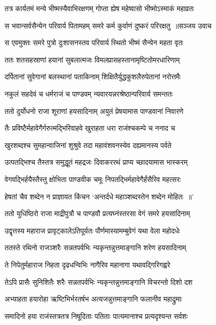 \twolineshloka
{तत्र कार्यतमं मन्ये भीष्मस्यैवाभिरक्षणम्}
{गोप्ता ह्येष महेष्वासो भीष्मोऽस्माकं महाव्रतः}


\threelineshloka
{स भवान्सर्वसैन्येन परिवार्य पितामहम्}
{समरे कर्म कुर्वाणं दुष्करं परिरक्षतु ॥सञ्जय उवाच}
{}


\twolineshloka
{स एवमुक्तः समरे पुत्रो दुःशासनस्तव}
{परिवार्य स्थितो भीष्मं सैन्येन महता वृतः}


\twolineshloka
{ततः शतसहस्राणां हयानां सुबलात्मजः}
{विमलप्रासहस्तानामृष्टितोमरधारिणाम्}


\twolineshloka
{दर्पितानां सुवेगानां बलस्थानां पताकिनाम्}
{शिक्षितैर्युद्धकुशलैरुपेतानां नरोत्तमैः}


\twolineshloka
{नकुलं सहदेवं च धर्मराजं च पाण्डवम्}
{न्यवारयन्नरश्रेष्ठान्परिवार्य समन्ततः}


\twolineshloka
{ततो दुर्योधनो राजा शूराणां हयसादिनाम्}
{अयुतं प्रेषयामास पाण्डवानां निवारणे}


\twolineshloka
{तैः प्रविष्टैर्महावेगैर्गरुत्मद्भिरिवाहवे}
{खुराहता धरा राजंश्चकम्पे च ननाद च}


\twolineshloka
{खुरशब्दश्च सुमहान्वाजिनां शुश्रुवे तदा}
{महावंशवनस्येव दह्यमानस्य पर्वते}


\twolineshloka
{उत्पतद्भिश्च तैस्तत्र समुद्धूतं महद्रजः}
{दिवाकररथं प्राप्य च्छादयामास भास्करम्}


\twolineshloka
{वेगवद्भिर्हयैस्तैस्तु क्षोभिता पाण्डवीक चमूः}
{निपतद्भिर्महावेगैर्हंसैरिव महत्सरः}


\twolineshloka
{हेषतां चैव शब्देन न प्राज्ञायत किंचन}
{`अन्तर्दधे महाञ्शब्दस्तेन शब्देन मोहितः ॥'}


\twolineshloka
{ततो युधिष्ठिरो राजा माद्रीपुत्रौ च पाण्डवौ}
{प्रत्यघ्नंस्तरसा वेगं समरे हयसादिनाम्}


\twolineshloka
{उद्वृत्तस्य महाराज प्रावृट्कालेऽतिपूर्यतः}
{पौर्णमास्यामम्बुवेगं यथा वेला महोदधेः}


\twolineshloka
{ततस्ते रथिनो राजञ्शरैः सन्नतपर्वभिः}
{न्यकृन्तन्नुत्तमाङ्गानि शरेण हयसादिनाम्}


\twolineshloka
{ते निपेतुर्महाराज निहता दृढधन्विभिः}
{नागैरिव महानागा यथावद्गिरिगह्वरे}


\twolineshloka
{तेऽपि प्रासैः सुनिशितैः शरैः सन्नतपर्वभिः}
{न्यकृन्तन्नुत्तमाङ्गानि विचरन्तो दिशो दश}


\twolineshloka
{अभ्याहता हयारोहा ऋष्टिभिर्भरतर्षभ}
{अत्यजन्नुत्तमाङ्गानि फलानीव महाद्रुमाः}


\twolineshloka
{समादिनो हया राजंस्तत्रतत्र निषूदिताः}
{पतिताः पात्यमानाश्च प्रत्यदृश्यन्त सर्वशः}


